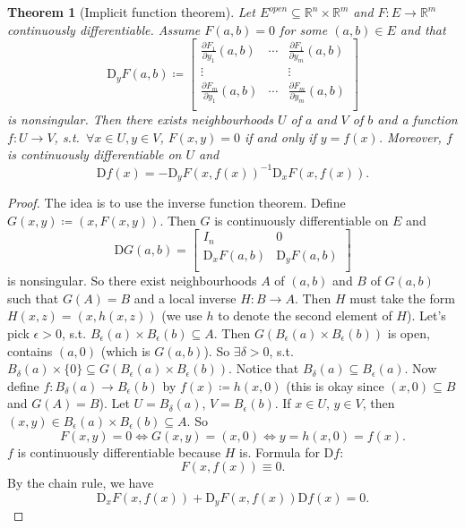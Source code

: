 \documentclass[12pt]{article}
\theoremstyle{plain}
\newtheorem{thm}{Theorem}
\theoremstyle{definition}
\begin{document}
\begin{thm}[Implicit function theorem]
    Let $E^{open}\subseteq \mathbb{R}^n\times \mathbb{R}^m$ and $F:E\rightarrow\mathbb{R}^m$ continuously differentiable.
    Assume $F(a,b) = 0$ for some $(a,b)\in E$ and that
    \[
        \mathrm{D}_y F(a,b)\coloneqq
        \begin{bmatrix}
            \frac{\partial F_1}{\partial y_1}(a,b)&\cdots&\frac{\partial F_1}{\partial y_m}(a,b)\\
            \vdots&&\vdots\\
            \frac{\partial F_m}{\partial y_1}(a,b)&\cdots&\frac{\partial F_m}{\partial y_m}(a,b)\\
        \end{bmatrix}
    \]
    is nonsingular.
    Then there exists neighbourhoods $U$ of $a$ and $V$ of $b$ and a function $f:U\rightarrow V$, s.t.\ $\forall x\in U, y\in V$, $F(x,y) = 0$ if and
    only if $y=f(x)$.
    Moreover, $f$ is continuously differentiable on $U$ and
    \[
        \mathrm{D}f(x) = -\mathrm{D}_yF(x,f(x))^{-1}\mathrm{D}_xF(x,f(x)).
    \]
\end{thm}
\begin{proof}
    The idea is to use the inverse function theorem.
    Define $G(x,y) \coloneqq (x,F(x,y))$.
    Then $G$ is continuously differentiable on $E$ and
    \[
        \mathrm{D}G(a,b)=\begin{bmatrix}
            I_n & 0\\
            \mathrm{D}_xF(a,b)&\mathrm{D}_y F(a,b)\\
        \end{bmatrix}
    \]
    is nonsingular.
    So there exist neighbourhoods $A$ of $(a,b)$ and $B$ of $G(a,b)$ such that 
    $G(A) = B$ and a local inverse $H:B\rightarrow A$.
    Then $H$ must take the form
    $H(x,z) = (x,h(x,z))$ (we use $h$ to denote the second element of $H$).
    Let's pick $\epsilon>0$, s.t. $B_\epsilon(a)\times B_\epsilon(b)\subseteq A$.
    Then $G(B_\epsilon(a)\times B_\epsilon(b))$ is open, contains $(a,0)$ (which is $G(a,b)$).
    So $\exists \delta>0$, s.t.\ $B_\delta(a)\times\{0\}\subseteq G(B_\epsilon(a)\times B_\epsilon(b))$.
    Notice that $B_\delta(a)\subseteq B_\epsilon(a)$.
    Now define $f:B_\delta(a)\rightarrow B_\epsilon(b)$ by $f(x)\coloneqq h(x,0)$ (this is okay since $(x,0)\subseteq B$ and $G(A)=B$).
    Let $U=B_\delta (a)$, $V=B_\epsilon(b)$.
    If $x\in U$, $y\in V$, then $(x,y)\in B_\epsilon(a)\times B_\epsilon(b)\subseteq A$.
    So 
    \[
        F(x,y) = 0\Longleftrightarrow G(x,y) = (x,0) \Longleftrightarrow y=h(x,0)=f(x).
    \]
    $f$ is continuously differentiable because $H$ is.
    Formula for $\mathrm{D}f$:
    \[
        F(x,f(x)) \equiv 0.
    \]
    By the chain rule, we have
    \[
        \mathrm{D}_x F(x,f(x)) + \mathrm{D}_y F(x,f(x))\mathrm{D}f(x) = 0.
    \]
\end{proof}
\end{document}
